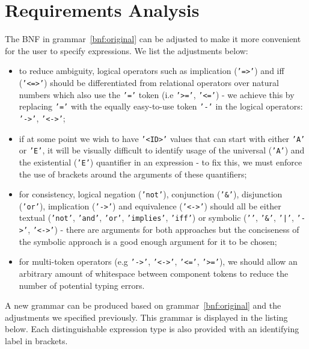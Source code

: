 \documentclass[12pt,oneside,a4paper,notitlepage]{report}
\newcommand{\texttilde}{\raisebox{0.5ex}{\texttildelow}}
\begin{document}
	\section*{Requirements Analysis}
	\par The BNF in grammar~\ref{bnf:original} can be adjusted to make it more convenient for the user to specify expressions. We list the adjustments below:
	\begin{itemize}
		\item to reduce ambiguity, logical operators such as implication (\texttt{'=\textgreater'}) and iff (\texttt{'\textless=\textgreater'}) should be differentiated from relational operators over natural numbers which also use the \texttt{'='} token (i.e \texttt{'\textgreater='}, \texttt{'\textless='}) - we achieve this by replacing \texttt{'='} with the equally easy-to-use token \texttt{'-'} in the logical operators: \texttt{'-\textgreater'}, \texttt{'\textless-\textgreater'};
		\item if at some point we wish to have \texttt{'\textless ID\textgreater'} values that can start with either \texttt{'A'} or \texttt{'E'}, it will be visually difficult to identify usage of the universal (\texttt{'A'}) and the existential (\texttt{'E'}) quantifier in an expression - to fix this, we must enforce the use of brackets around the arguments of these quantifiers;
		\item for consistency, logical negation (\texttt{'not'}), conjunction (\texttt{'\&'}), disjunction (\texttt{'or'}), implication (\texttt{'-\textgreater'}) and equivalence (\texttt{'\textless-\textgreater'}) should all be either textual (\texttt{'not'}, \texttt{'and'}, \texttt{'or'}, \texttt{'implies'}, \texttt{'iff'}) or symbolic (\texttt{'\texttilde'}, \texttt{'\&'}, \texttt{'|'}, \texttt{'-\textgreater'}, \texttt{'\textless-\textgreater'}) - there are arguments for both approaches but the conciseness of the symbolic approach is a good enough argument for it to be chosen;
		\item for multi-token operators (e.g \texttt{'-\textgreater'}, \texttt{'\textless-\textgreater'}, \texttt{'\textless='}, \texttt{'\textgreater='}), we should allow an arbitrary amount of whitespace between component tokens to reduce the number of potential typing errors.
	\end{itemize}

	\bigskip

	\par A new grammar can be produced based on grammar~\ref{bnf:original} and the adjustments we specified previously. This grammar is displayed in the listing below. Each distinguishable expression type is also provided with an identifying label in brackets.
		
\end{document}

